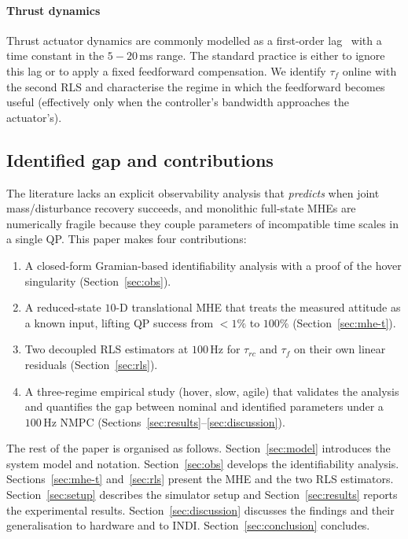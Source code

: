 \documentclass[lettersize,journal]{IEEEtran}
\begin{document}
\paragraph*{Thrust dynamics}
Thrust actuator dynamics are commonly modelled as a first-order
lag~\cite{bauersfeld2021neurobem} with a time constant in the
$5\!-\!20$\,ms range.  The standard practice is either to ignore
this lag or to apply a fixed feedforward compensation.  We
identify $\tau_f$ online with the second RLS and characterise
the regime in which the feedforward becomes useful (effectively
only when the controller's bandwidth approaches the actuator's).

\subsection{Identified gap and contributions}
The literature lacks an explicit observability analysis that
\emph{predicts} when joint mass/disturbance recovery succeeds,
and monolithic full-state MHEs are numerically fragile because
they couple parameters of incompatible time scales in a single
QP.  This paper makes four contributions:

\begin{enumerate}
\item A closed-form Gramian-based identifiability analysis with
a proof of the hover singularity (Section~\ref{sec:obs}).
\item A reduced-state $10$-D translational MHE that treats the
measured attitude as a known input, lifting QP success from
$<\!1\%$ to $100\%$ (Section~\ref{sec:mhe-t}).
\item Two decoupled RLS estimators at $100$\,Hz for $\tau_{rc}$
and $\tau_f$ on their own linear residuals (Section~\ref{sec:rls}).
\item A three-regime empirical study (hover, slow, agile) that
validates the analysis and quantifies the gap between nominal
and identified parameters under a $100$\,Hz NMPC
(Sections~\ref{sec:results}--\ref{sec:discussion}).
\end{enumerate}

The rest of the paper is organised as follows.
Section~\ref{sec:model} introduces the system model and notation.
Section~\ref{sec:obs} develops the identifiability analysis.
Sections~\ref{sec:mhe-t} and~\ref{sec:rls} present the MHE and the
two RLS estimators.  Section~\ref{sec:setup} describes the
simulator setup and Section~\ref{sec:results} reports the
experimental results.  Section~\ref{sec:discussion} discusses the
findings and their generalisation to hardware and to INDI.
Section~\ref{sec:conclusion} concludes.
\end{document}
